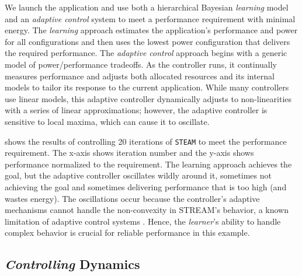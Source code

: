 We launch the application and use both a hierarchical Bayesian
\emph{learning} model \cite{LEO} and an \emph{adaptive control} system
\cite{POET} to meet a performance requirement with minimal energy.
The \emph{learning} approach estimates the application's performance
and power for all configurations and then uses the lowest power
configuration that delivers the required performance.  The
\emph{adaptive control} approach begins with a generic model of
power/performance tradeoffs.  As the controller runs, it continually
measures performance and adjusts both allocated resources and its
internal models to tailor its response to the current application.
While many controllers use linear models, this adaptive controller
dynamically adjusts to non-linearities with a series of linear
approximations; however, the adaptive controller is sensitive to local
maxima, which can cause it to oscillate.

 shows the results of controlling 20
iterations of \texttt{STEAM} to meet the performance requirement.  The
x-axis shows iteration number and the y-axis shows performance
normalized to the requirement.  The learning approach achieves the
goal, but the adaptive controller oscillates wildly around it,
sometimes not achieving the goal and sometimes delivering performance
that is too high (and wastes energy). The oscillations occur because
the controller's adaptive mechanisms cannot handle the non-convexity
in STREAM's behavior, a known limitation of adaptive control systems
\cite{LEO,ICSE2014}.  Hence, the \emph{learner}'s ability to handle
complex behavior is crucial for reliable performance in this example.


\subsection{\emph{Controlling} Dynamics}




